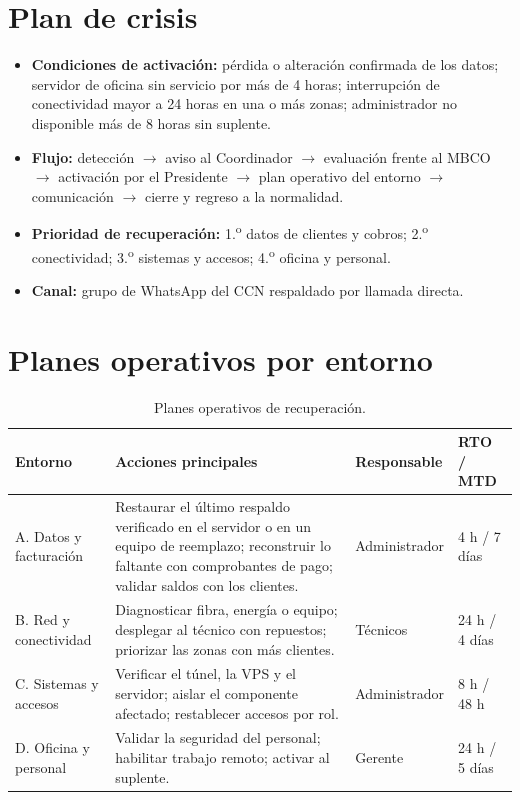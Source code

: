 \section{Plan de crisis}
\begin{itemize}
  \item \textbf{Condiciones de activación:} pérdida o alteración confirmada de los datos;
  servidor de oficina sin servicio por más de 4 horas; interrupción de conectividad mayor a
  24 horas en una o más zonas; administrador no disponible más de 8 horas sin suplente.
  \item \textbf{Flujo:} detección $\rightarrow$ aviso al Coordinador $\rightarrow$ evaluación
  frente al MBCO $\rightarrow$ activación por el Presidente $\rightarrow$ plan operativo del
  entorno $\rightarrow$ comunicación $\rightarrow$ cierre y regreso a la normalidad.
  \item \textbf{Prioridad de recuperación:} 1.\textsuperscript{o} datos de clientes y cobros;
  2.\textsuperscript{o} conectividad; 3.\textsuperscript{o} sistemas y accesos;
  4.\textsuperscript{o} oficina y personal.
  \item \textbf{Canal:} grupo de WhatsApp del CCN respaldado por llamada directa.
\end{itemize}

\section{Planes operativos por entorno}

\begin{table}[H]
\centering
\caption{Planes operativos de recuperación.}
\label{tab:anx-pcn-entornos}
\small
\begin{tabularx}{\textwidth}{L{2.4cm}XL{2.1cm}L{1.8cm}}
\toprule
\textbf{Entorno} & \textbf{Acciones principales} & \textbf{Responsable} & \textbf{RTO / MTD} \\
\midrule
A. Datos y facturación & Restaurar el último respaldo verificado en el servidor o en un equipo de reemplazo; reconstruir lo faltante con comprobantes de pago; validar saldos con los clientes. & Administrador & 4 h / 7 días \\
B. Red y conectividad & Diagnosticar fibra, energía o equipo; desplegar al técnico con repuestos; priorizar las zonas con más clientes. & Técnicos & 24 h / 4 días \\
C. Sistemas y accesos & Verificar el túnel, la VPS y el servidor; aislar el componente afectado; restablecer accesos por rol. & Administrador & 8 h / 48 h \\
D. Oficina y personal & Validar la seguridad del personal; habilitar trabajo remoto; activar al suplente. & Gerente & 24 h / 5 días \\
\bottomrule
\end{tabularx}
\end{table}

